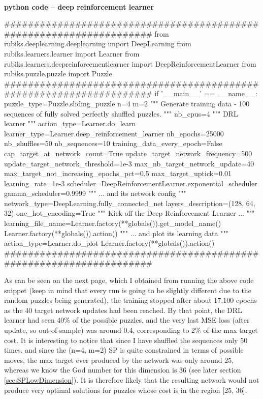 \paragraph{}{\textbf{python code -- deep reinforcement learner}}
\begin{python}
####################################################################
from rubiks.deeplearning.deeplearning import DeepLearning
from rubiks.learners.learner import Learner
from rubiks.learners.deepreinforcementlearner import DeepReinforcementLearner
from rubiks.puzzle.puzzle import Puzzle
####################################################################
if '__main__' == __name__:
    puzzle_type=Puzzle.sliding_puzzle
    n=4
    m=2
    """ Generate training data - 100 sequences of fully 
    solved perfectly shuffled puzzles. 
    """
    nb_cpus=4
    """ DRL learner """
    action_type=Learner.do_learn
    learner_type=Learner.deep_reinforcement_learner
    nb_epochs=25000
    nb_shuffles=50
    nb_sequences=10
    training_data_every_epoch=False
    cap_target_at_network_count=True
    update_target_network_frequency=500
    update_target_network_threshold=1e-3
    max_nb_target_network_update=40
    max_target_not_increasing_epochs_pct=0.5
    max_target_uptick=0.01
    learning_rate=1e-3
    scheduler=DeepReinforcementLearner.exponential_scheduler
    gamma_scheduler=0.9999
    """ ... and its network config """
    network_type=DeepLearning.fully_connected_net
    layers_description=(128, 64, 32)
    one_hot_encoding=True
    """ Kick-off the Deep Reinforcement Learner ... """
    learning_file_name=Learner.factory(**globals()).get_model_name()
    Learner.factory(**globals()).action()
    """ ... and plot its learning data """
    action_type=Learner.do_plot
    Learner.factory(**globals()).action()
####################################################################
\end{python}
\black
As can be seen on the next page, which I obtained from running the above code snippet (keep in mind that every run is going to be slightly different due to the random puzzles being generated), the training stopped after about 17,100 epochs as the 40 target network updates had been reached. By that point, the DRL learner had seen 40\% of the possible puzzles, and the very last MSE loss (after update, so out-of-sample) was around 0.4, corresponding to 2\% of the max target cost. It is interesting to notice that since I have shuffled the sequences only 50 times, and since the (n=4, m=2) SP is quite constrained in terms of possible moves, the max target ever produced by the network was only around 25, whereas we know the God number for this dimension is 36 (see later section \ref{sec:SPLowDimension}). It is therefore likely that the resulting network would not produce very optimal solutions for puzzles whose cost is in the region [25, 36]. 


